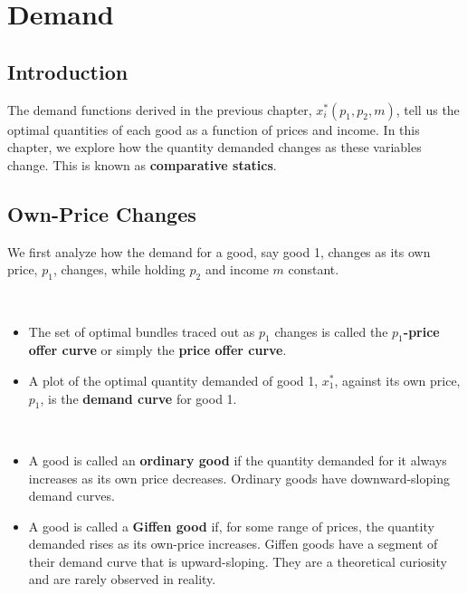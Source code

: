 
\chapter{Demand}\label{chap:demand}

\section{Introduction}

The demand functions derived in the previous chapter, $x_i^*(p_1, p_2, m)$, tell us the optimal quantities of each good as a function of prices and income. In this chapter, we explore how the quantity demanded changes as these variables change. This is known as \textbf{comparative statics}.

\section{Own-Price Changes}

We first analyze how the demand for a good, say good 1, changes as its own price, $p_1$, changes, while holding $p_2$ and income $m$ constant.

\begin{definition}
~
\begin{itemize}
    \item The set of optimal bundles traced out as $p_1$ changes is called the \textbf{$p_1$-price offer curve} or simply the \textbf{price offer curve}.
    \item A plot of the optimal quantity demanded of good 1, $x_1^*$, against its own price, $p_1$, is the \textbf{demand curve} for good 1.
\end{itemize}
\end{definition}

\begin{definition}
~
\begin{itemize}
    \item A good is called an \textbf{ordinary good} if the quantity demanded for it always increases as its own price decreases. Ordinary goods have downward-sloping demand curves.
    \item A good is called a \textbf{Giffen good} if, for some range of prices, the quantity demanded rises as its own-price increases. Giffen goods have a segment of their demand curve that is upward-sloping. They are a theoretical curiosity and are rarely observed in reality.
\end{itemize}
\end{definition}

